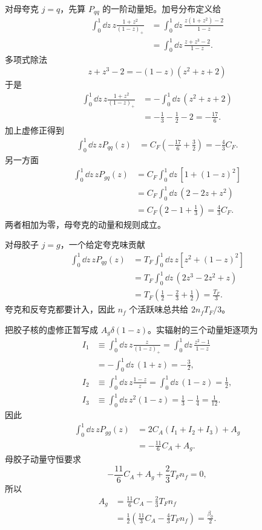 \begin{derivation}
对母夸克 $j=q$，先算 $P_{qq}$ 的一阶动量矩。加号分布定义给
\begin{align*}
 \int_0^1\dd z\,
 z\frac{1+z^2}{(1-z)_+}
 &=\int_0^1\dd z\,
 \frac{z(1+z^2)-2}{1-z}\\
 &=\int_0^1\dd z\,
 \frac{z+z^3-2}{1-z}.
\end{align*}
多项式除法
\begin{equation*}
 z+z^3-2=-(1-z)(z^2+z+2)
\end{equation*}
于是
\begin{align*}
 \int_0^1\dd z\,
 z\frac{1+z^2}{(1-z)_+}
 &=-\int_0^1\dd z\,(z^2+z+2)\\
 &=-\frac13-\frac12-2
 =-\frac{17}{6}.
\end{align*}
加上虚修正得到
\begin{align*}
 \int_0^1\dd z\,zP_{qq}(z)
 &=C_F\left(-\frac{17}{6}+\frac32\right)
 =-\frac43C_F.
\end{align*}
另一方面
\begin{align*}
 \int_0^1\dd z\,zP_{gq}(z)
 &=C_F\int_0^1\dd z\,
 \left[1+(1-z)^2\right]\\
 &=C_F\int_0^1\dd z\,(2-2z+z^2)\\
 &=C_F\left(2-1+\frac13\right)
 =\frac43C_F.
\end{align*}
两者相加为零，母夸克的动量和规则成立。

对母胶子 $j=g$，一个给定夸克味贡献
\begin{align*}
 \int_0^1\dd z\,zP_{qg}(z)
 &=T_F\int_0^1\dd z\,
 z\left[z^2+(1-z)^2\right]\\
 &=T_F\int_0^1\dd z\,
 (2z^3-2z^2+z)\\
 &=T_F\left(\frac12-\frac23+\frac12\right)
 =\frac{T_F}{3}.
\end{align*}
夸克和反夸克都要计入，因此 $n_f$ 个活跃味总共给 $2n_fT_F/3$。

把胶子核的虚修正暂写成 $A_g\delta(1-z)$。实辐射的三个动量矩逐项为
\begin{align*}
 I_1
 &\equiv\int_0^1\dd z\,
 z\frac{z}{(1-z)_+}
 =\int_0^1\dd z\,
 \frac{z^2-1}{1-z}\\
 &=-\int_0^1\dd z\,(1+z)
 =-\frac32,\\[2mm]
 I_2
 &\equiv\int_0^1\dd z\,z\frac{1-z}{z}
 =\int_0^1\dd z\,(1-z)
 =\frac12,\\[2mm]
 I_3
 &\equiv\int_0^1\dd z\,z^2(1-z)
 =\frac13-\frac14
 =\frac1{12}.
\end{align*}
因此
\begin{align*}
 \int_0^1\dd z\,zP_{gg}(z)
 &=2C_A(I_1+I_2+I_3)+A_g\\
 &=-\frac{11}{6}C_A+A_g.
\end{align*}
母胶子动量守恒要求
\begin{equation*}
 -\frac{11}{6}C_A+A_g+\frac23T_Fn_f=0,
\end{equation*}
所以
\begin{align*}
 A_g
 &=\frac{11}{6}C_A-\frac23T_Fn_f\\
 &=\frac12\left(\frac{11}{3}C_A-\frac43T_Fn_f\right)
 =\frac{\beta_0}{2}.
\end{align*}
\end{derivation}
